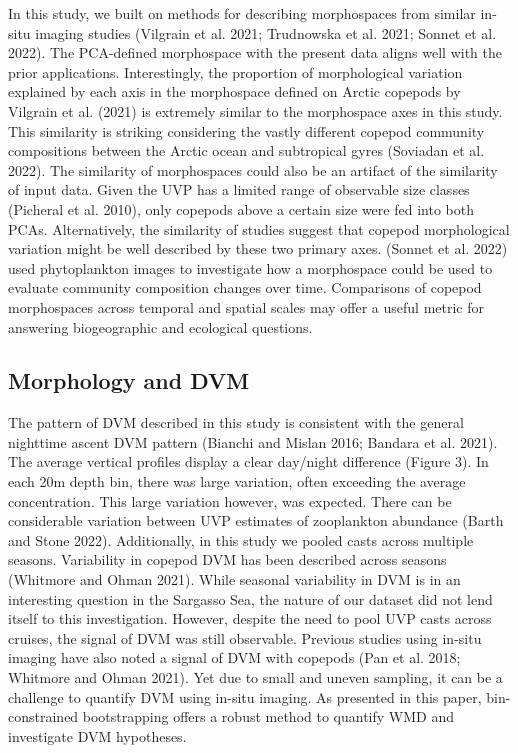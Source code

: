 \documentclass[
]{article}
\begin{document}
In this study, we built on methods for describing morphospaces from
similar in-situ imaging studies (Vilgrain et al. 2021; Trudnowska et al.
2021; Sonnet et al. 2022). The PCA-defined morphospace with the present
data aligns well with the prior applications. Interestingly, the
proportion of morphological variation explained by each axis in the
morphospace defined on Arctic copepods by Vilgrain et al. (2021) is
extremely similar to the morphospace axes in this study. This similarity
is striking considering the vastly different copepod community
compositions between the Arctic ocean and subtropical gyres (Soviadan et
al. 2022). The similarity of morphospaces could also be an artifact of
the similarity of input data. Given the UVP has a limited range of
observable size classes (Picheral et al. 2010), only copepods above a
certain size were fed into both PCAs. Alternatively, the similarity of
studies suggest that copepod morphological variation might be well
described by these two primary axes. (Sonnet et al. 2022) used
phytoplankton images to investigate how a morphospace could be used to
evaluate community composition changes over time. Comparisons of copepod
morphospaces across temporal and spatial scales may offer a useful
metric for answering biogeographic and ecological questions.

\hypertarget{morphology-and-dvm}{%
\subsection{Morphology and DVM}\label{morphology-and-dvm}}

The pattern of DVM described in this study is consistent with the
general nighttime ascent DVM pattern (Bianchi and Mislan 2016; Bandara
et al. 2021). The average vertical profiles display a clear day/night
difference (Figure 3). In each 20m depth bin, there was large variation,
often exceeding the average concentration. This large variation however,
was expected. There can be considerable variation between UVP estimates
of zooplankton abundance (Barth and Stone 2022). Additionally, in this
study we pooled casts across multiple seasons. Variability in copepod
DVM has been described across seasons (Whitmore and Ohman 2021). While
seasonal variability in DVM is in an interesting question in the
Sargasso Sea, the nature of our dataset did not lend itself to this
investigation. However, despite the need to pool UVP casts across
cruises, the signal of DVM was still observable. Previous studies using
in-situ imaging have also noted a signal of DVM with copepods (Pan et
al. 2018; Whitmore and Ohman 2021). Yet due to small and uneven
sampling, it can be a challenge to quantify DVM using in-situ imaging.
As presented in this paper, bin-constrained bootstrapping offers a
robust method to quantify WMD and investigate DVM hypotheses.
\end{document}
